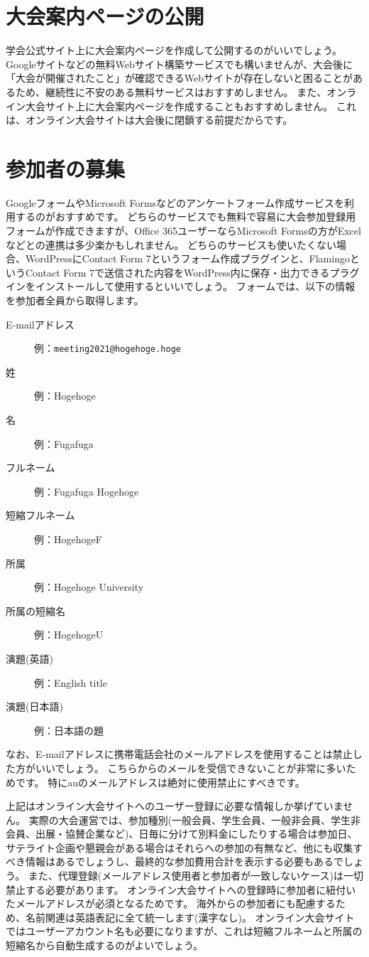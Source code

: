 \documentclass[titlepage,10pt,a4paper,uplatex]{jsbook}
\begin{document}
\section{大会案内ページの公開}

学会公式サイト上に大会案内ページを作成して公開するのがいいでしょう。
Googleサイトなどの無料Webサイト構築サービスでも構いませんが、大会後に「大会が開催されたこと」が確認できるWebサイトが存在しないと困ることがあるため、継続性に不安のある無料サービスはおすすめしません。
また、オンライン大会サイト上に大会案内ページを作成することもおすすめしません。
これは、オンライン大会サイトは大会後に閉鎖する前提だからです。

\section{参加者の募集}

GoogleフォームやMicrosoft Formsなどのアンケートフォーム作成サービスを利用するのがおすすめです。
どちらのサービスでも無料で容易に大会参加登録用フォームが作成できますが、Office 365ユーザーならMicrosoft Formsの方がExcelなどとの連携は多少楽かもしれません。
どちらのサービスも使いたくない場合、WordPressにContact Form 7というフォーム作成プラグインと、FlamingoというContact Form 7で送信された内容をWordPress内に保存・出力できるプラグインをインストールして使用するといいでしょう。
フォームでは、以下の情報を参加者全員から取得します。

\begin{description}
\item[E-mailアドレス] 例：\texttt{meeting2021@hogehoge.hoge}
\item[姓] 例：Hogehoge
\item[名] 例：Fugafuga
\item[フルネーム] 例：Fugafuga Hogehoge
\item[短縮フルネーム] 例：HogehogeF
\item[所属] 例：Hogehoge University
\item[所属の短縮名] 例：HogehogeU
\item[演題(英語)] 例：English title
\item[演題(日本語)] 例：日本語の題
\end{description}

なお、E-mailアドレスに携帯電話会社のメールアドレスを使用することは禁止した方がいいでしょう。
こちらからのメールを受信できないことが非常に多いためです。
特にauのメールアドレスは絶対に使用禁止にすべきです。

上記はオンライン大会サイトへのユーザー登録に必要な情報しか挙げていません。
実際の大会運営では、参加種別(一般会員、学生会員、一般非会員、学生非会員、出展・協賛企業など)、日毎に分けて別料金にしたりする場合は参加日、サテライト企画や懇親会がある場合はそれらへの参加の有無など、他にも収集すべき情報はあるでしょうし、最終的な参加費用合計を表示する必要もあるでしょう。
また、代理登録(メールアドレス使用者と参加者が一致しないケース)は一切禁止する必要があります。
オンライン大会サイトへの登録時に参加者に紐付いたメールアドレスが必須となるためです。
海外からの参加者にも配慮するため、名前関連は英語表記に全て統一します(漢字なし)。
オンライン大会サイトではユーザーアカウント名も必要になりますが、これは短縮フルネームと所属の短縮名から自動生成するのがよいでしょう。
\end{document}
